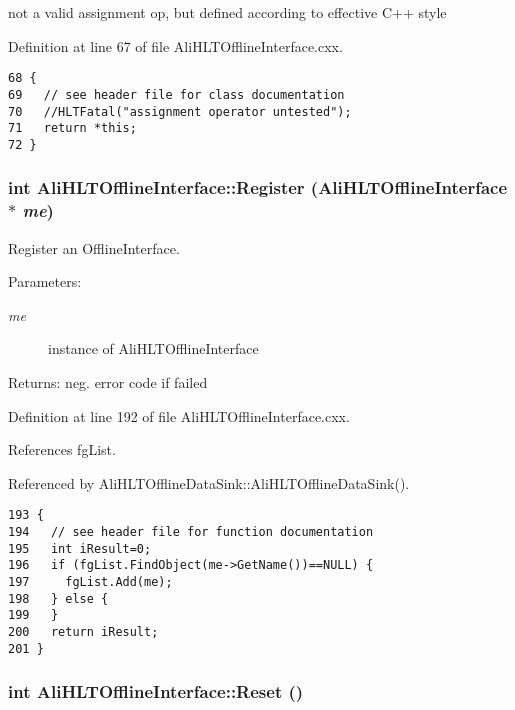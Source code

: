 not a valid assignment op, but defined according to effective C++ style 

Definition at line 67 of file Ali\-HLTOffline\-Interface.cxx.

\footnotesize\begin{verbatim}68 { 
69   // see header file for class documentation
70   //HLTFatal("assignment operator untested");
71   return *this;
72 }
\end{verbatim}\normalsize 


\subsubsection{\setlength{\rightskip}{0pt plus 5cm}int Ali\-HLTOffline\-Interface::Register ({\bf Ali\-HLTOffline\-Interface} $\ast$ {\em me})\hspace{0.3cm}{\tt  [static, protected]}}\label{classAliHLTOfflineInterface_f0}


Register an Offline\-Interface. \begin{Desc}
\item[Parameters:]
\begin{description}
\item[{\em me}]instance of Ali\-HLTOffline\-Interface \end{description}
\end{Desc}
\begin{Desc}
\item[Returns:]neg. error code if failed \end{Desc}


Definition at line 192 of file Ali\-HLTOffline\-Interface.cxx.

References fg\-List.

Referenced by Ali\-HLTOffline\-Data\-Sink::Ali\-HLTOffline\-Data\-Sink().

\footnotesize\begin{verbatim}193 {
194   // see header file for function documentation
195   int iResult=0;
196   if (fgList.FindObject(me->GetName())==NULL) {
197     fgList.Add(me);
198   } else {
199   }
200   return iResult;
201 }
\end{verbatim}\normalsize 


\subsubsection{\setlength{\rightskip}{0pt plus 5cm}int Ali\-HLTOffline\-Interface::Reset ()}\label{classAliHLTOfflineInterface_a10}


